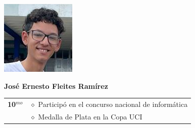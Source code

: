 \begin{minipage}{0.2\textwidth}
	\includegraphics[width=\linewidth]{img/concursantes/jose.png} %
\end{minipage}
\hfill
\begin{minipage}{0.7\textwidth}
	\textbf{José Ernesto Fleites Ramírez}
	
	\vspace*{0.1in}
	\begin{tabular}{rl}
		
		
		
		\textbf{10$^{mo}$} 
		& $\diamond$ Participó en el concurso nacional de informática \\
		& $\diamond$ Medalla de Plata en la Copa UCI \\
		
		
		
	\end{tabular}
\end{minipage}

\vspace*{0.2in}

